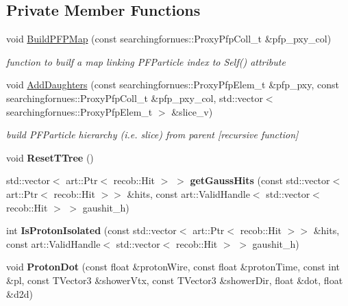 \subsection*{Private Member Functions}
\begin{DoxyCompactItemize}
\item 
void \hyperlink{classProtonTruthStudies_a7e04fe8bb75084fa9592aa7c3a0bd985}{Build\+P\+F\+P\+Map} (const searchingfornues\+::\+Proxy\+Pfp\+Coll\+\_\+t \&pfp\+\_\+pxy\+\_\+col)
\begin{DoxyCompactList}\small\item\em function to builf a map linking P\+F\+Particle index to Self() attribute \end{DoxyCompactList}\item 
void \hyperlink{classProtonTruthStudies_adf98811f4b6fd85f8c72684a848ece17}{Add\+Daughters} (const searchingfornues\+::\+Proxy\+Pfp\+Elem\+\_\+t \&pfp\+\_\+pxy, const searchingfornues\+::\+Proxy\+Pfp\+Coll\+\_\+t \&pfp\+\_\+pxy\+\_\+col, std\+::vector$<$ searchingfornues\+::\+Proxy\+Pfp\+Elem\+\_\+t $>$ \&slice\+\_\+v)
\begin{DoxyCompactList}\small\item\em build P\+F\+Particle hierarchy (i.\+e. slice) from parent \mbox{[}recursive function\mbox{]} \end{DoxyCompactList}\item 
void {\bfseries Reset\+T\+Tree} ()\hypertarget{classProtonTruthStudies_adc6be889a86ce1ef0e01f46b45c6af03}{}\label{classProtonTruthStudies_adc6be889a86ce1ef0e01f46b45c6af03}

\item 
std\+::vector$<$ art\+::\+Ptr$<$ recob\+::\+Hit $>$ $>$ {\bfseries get\+Gauss\+Hits} (const std\+::vector$<$ art\+::\+Ptr$<$ recob\+::\+Hit $>$$>$ \&hits, const art\+::\+Valid\+Handle$<$ std\+::vector$<$ recob\+::\+Hit $>$ $>$ gaushit\+\_\+h)\hypertarget{classProtonTruthStudies_a46a91c011a4e2d0d26f7db746dfac2a3}{}\label{classProtonTruthStudies_a46a91c011a4e2d0d26f7db746dfac2a3}

\item 
int {\bfseries Is\+Proton\+Isolated} (const std\+::vector$<$ art\+::\+Ptr$<$ recob\+::\+Hit $>$$>$ \&hits, const art\+::\+Valid\+Handle$<$ std\+::vector$<$ recob\+::\+Hit $>$ $>$ gaushit\+\_\+h)\hypertarget{classProtonTruthStudies_a52222968a8c233bcde690d71c51b0f1e}{}\label{classProtonTruthStudies_a52222968a8c233bcde690d71c51b0f1e}

\item 
void {\bfseries Proton\+Dot} (const float \&proton\+Wire, const float \&proton\+Time, const int \&pl, const T\+Vector3 \&shower\+Vtx, const T\+Vector3 \&shower\+Dir, float \&dot, float \&d2d)\hypertarget{classProtonTruthStudies_a2d14a1b19fd97a5e123e022ab927f448}{}\label{classProtonTruthStudies_a2d14a1b19fd97a5e123e022ab927f448}


\end{DoxyCompactItemize}
